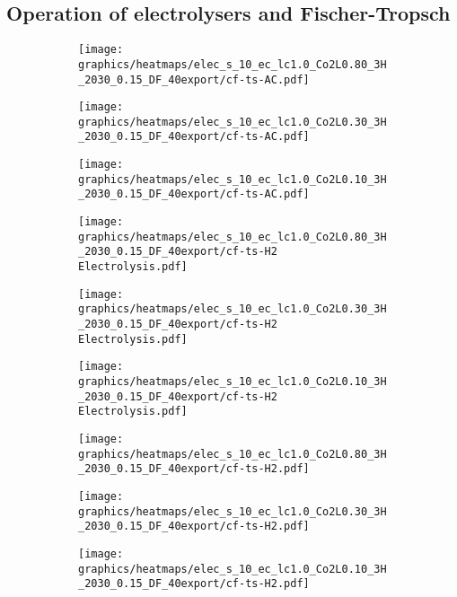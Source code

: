 \subsection{Operation of electrolysers and Fischer-Tropsch}


\clearpage
\onecolumn
\begin{figure}
    \centering
        \begin{subfigure}[t]{0.33\textwidth}
            \centering
        \texttt{[image: graphics/heatmaps/elec\_s\_10\_ec\_lc1.0\_Co2L0.80\_3H\_2030\_0.15\_DF\_40export/cf-ts-AC.pdf]}
    \end{subfigure}
    \begin{subfigure}[t]{0.33\textwidth}
        \centering
        \texttt{[image: graphics/heatmaps/elec\_s\_10\_ec\_lc1.0\_Co2L0.30\_3H\_2030\_0.15\_DF\_40export/cf-ts-AC.pdf]}
    \end{subfigure}
    \begin{subfigure}[t]{0.33\textwidth}
        \centering
        \texttt{[image: graphics/heatmaps/elec\_s\_10\_ec\_lc1.0\_Co2L0.10\_3H\_2030\_0.15\_DF\_40export/cf-ts-AC.pdf]}
    \end{subfigure}


    \begin{subfigure}[t]{0.33\textwidth}
        \centering
        \texttt{[image: graphics/heatmaps/elec\_s\_10\_ec\_lc1.0\_Co2L0.80\_3H\_2030\_0.15\_DF\_40export/cf-ts-H2 Electrolysis.pdf]}
    \end{subfigure}
    \begin{subfigure}[t]{0.33\textwidth}
        \centering
        \texttt{[image: graphics/heatmaps/elec\_s\_10\_ec\_lc1.0\_Co2L0.30\_3H\_2030\_0.15\_DF\_40export/cf-ts-H2 Electrolysis.pdf]}
    \end{subfigure}
    \begin{subfigure}[t]{0.33\textwidth}
        \centering
        \texttt{[image: graphics/heatmaps/elec\_s\_10\_ec\_lc1.0\_Co2L0.10\_3H\_2030\_0.15\_DF\_40export/cf-ts-H2 Electrolysis.pdf]}
    \end{subfigure}

    \begin{subfigure}[t]{0.33\textwidth}
        \centering
        \texttt{[image: graphics/heatmaps/elec\_s\_10\_ec\_lc1.0\_Co2L0.80\_3H\_2030\_0.15\_DF\_40export/cf-ts-H2.pdf]}
    \end{subfigure}
    \begin{subfigure}[t]{0.33\textwidth}
        \centering
        \texttt{[image: graphics/heatmaps/elec\_s\_10\_ec\_lc1.0\_Co2L0.30\_3H\_2030\_0.15\_DF\_40export/cf-ts-H2.pdf]}
    \end{subfigure}
    \begin{subfigure}[t]{0.33\textwidth}
        \centering
        \texttt{[image: graphics/heatmaps/elec\_s\_10\_ec\_lc1.0\_Co2L0.10\_3H\_2030\_0.15\_DF\_40export/cf-ts-H2.pdf]}
        

\end{subfigure}
\end{figure}

